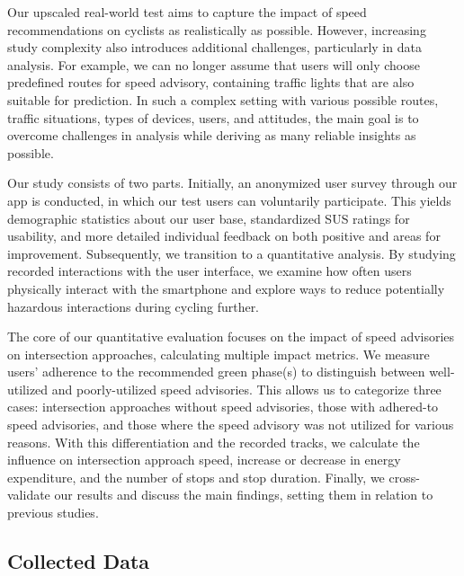 Our upscaled real-world test aims to capture the impact of speed recommendations on cyclists as realistically as possible. However, increasing study complexity also introduces additional challenges, particularly in data analysis. For example, we can no longer assume that users will only choose predefined routes for speed advisory, containing traffic lights that are also suitable for prediction. In such a complex setting with various possible routes, traffic situations, types of devices, users, and attitudes, the main goal is to overcome challenges in analysis while deriving as many reliable insights as possible. 

Our study consists of two parts. Initially, an anonymized user survey through our app is conducted, in which our test users can voluntarily participate. This yields demographic statistics about our user base, standardized SUS ratings for usability, and more detailed individual feedback on both positive and areas for improvement. Subsequently, we transition to a quantitative analysis. By studying recorded interactions with the user interface, we examine how often users physically interact with the smartphone and explore ways to reduce potentially hazardous interactions during cycling further.

The core of our quantitative evaluation focuses on the impact of speed advisories on intersection approaches, calculating multiple impact metrics. We measure users' adherence to the recommended green phase(s) to distinguish between well-utilized and poorly-utilized speed advisories. This allows us to categorize three cases: intersection approaches without speed advisories, those with adhered-to speed advisories, and those where the speed advisory was not utilized for various reasons. With this differentiation and the recorded tracks, we calculate the influence on intersection approach speed, increase or decrease in energy expenditure, and the number of stops and stop duration. Finally, we cross-validate our results and discuss the main findings, setting them in relation to previous studies.

\subsection{Collected Data}

